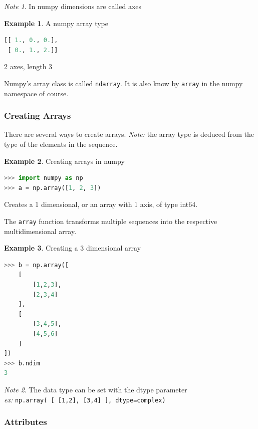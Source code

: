 \documentclass{article}
\theoremstyle{definition}
\newtheorem{ex}{Example}[subsection]
\theoremstyle{remark}
\newtheorem*{nb}{Note}
\begin{document}
\begin{nb}
In numpy dimensions are called axes
\end{nb}

\begin{ex} A numpy array type
\begin{lstlisting}[language=Python]
[[ 1., 0., 0.],
 [ 0., 1., 2.]]
\end{lstlisting}
2 axes, length 3
\end{ex}

Numpy's array class is called \lstinline{ndarray}. It is also know by \lstinline{array} in the numpy namespace of course.


\subsubsection{Creating Arrays}

There are several ways to create arrays. \textit{Note:} the array type is deduced from the type of the elements in the sequence. 

\begin{ex} Creating arrays in numpy
\begin{lstlisting}[language=Python]
>>> import numpy as np
>>> a = np.array([1, 2, 3])
\end{lstlisting}
Creates a 1 dimensional, or an array with 1 axis, of type int64.
\end{ex}

The \lstinline{array} function transforms multiple sequences into the respective multidimensional array.

\begin{ex} Creating a 3 dimensional array
\begin{lstlisting}[language=Python]
>>> b = np.array([
    [
        [1,2,3],
        [2,3,4]
    ],
    [
        [3,4,5],
        [4,5,6]
    ]
])
>>> b.ndim
3
\end{lstlisting}
\end{ex}

\begin{nb}
    The data type can be set with the dtype parameter\\ \textit{ex:} \lstinline{np.array( [ [1,2], [3,4] ], dtype=complex)}
\end{nb}


\subsubsection{Attributes}
\end{document}
